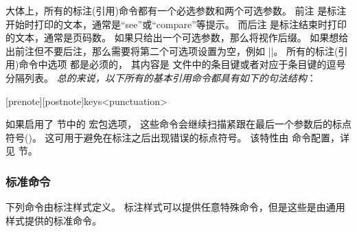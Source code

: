 大体上，所有的标注(引用)命令都有一个必选参数和两个可选参数。
前注  是标注开始时打印的文本，通常是“see”或“compare”等提示。
而后注  是标注结束时打印的文本，通常是页码数。
如果只给出一个可选参数，那么将视作后缀。
如果想给出前注但不要后注，那么需要将第二个可选项设置为空，例如 |\cite[see][]{key}|。
所有的标注(引用)命令中选项  都是必须的，
其内容是  文件中的条目键或者对应于条目键的逗号分隔列表。
\emph{总的来说，以下所有的基本引用命令都具有如下的句法结构}：

\begin{ltxsyntax}

[prenote][postnote]{keys}<punctuation>

如果启用了  节中的  宏包选项，
这些命令会继续扫描紧跟在最后一个参数后的标点符号()。
这可用于避免在标注之后出现错误的标点符号。
该特性由  命令配置，详见  节。

\end{ltxsyntax}

\subsubsection{标准命令} %
\label{use:cit:std}


下列命令由标注样式定义。
标注样式可以提供任意特殊命令，但是这些是由通用样式提供的标准命令。


